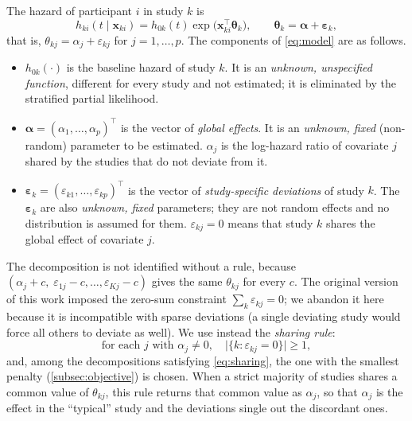 \documentclass[11pt]{article}
\theoremstyle{remark}
\numberwithin{equation}{section}
\newcommand{\bx}{\mathbf{x}}
\newcommand{\balpha}{\boldsymbol{\alpha}}
\newcommand{\beps}{\boldsymbol{\varepsilon}}
\newcommand{\btheta}{\boldsymbol{\theta}}
\begin{document}
The hazard of participant $i$ in study $k$ is
\begin{equation}
  h_{ki}(t\mid\bx_{ki}) = h_{0k}(t)\exp\bigl(\bx_{ki}^\top\btheta_k\bigr),
  \qquad
  \btheta_k=\balpha+\beps_k ,
  \label{eq:model}
\end{equation}
that is, $\theta_{kj}=\alpha_j+\varepsilon_{kj}$ for $j=1,\dots,p$. The
components of \eqref{eq:model} are as follows.
\begin{itemize}
  \item $h_{0k}(\cdot)$ is the baseline hazard of study $k$. It is an
    \emph{unknown, unspecified function}, different for every study and not
    estimated; it is eliminated by the stratified partial likelihood.
  \item $\balpha=(\alpha_1,\dots,\alpha_p)^\top$ is the vector of
    \emph{global effects}. It is an \emph{unknown, fixed} (non-random)
    parameter to be estimated. $\alpha_j$ is the log-hazard ratio of covariate
    $j$ shared by the studies that do not deviate from it.
  \item $\beps_k=(\varepsilon_{k1},\dots,\varepsilon_{kp})^\top$ is the vector
    of \emph{study-specific deviations} of study $k$. The $\beps_k$ are also
    \emph{unknown, fixed} parameters; they are not random effects and no
    distribution is assumed for them. $\varepsilon_{kj}=0$ means that study $k$
    shares the global effect of covariate $j$.
\end{itemize}
The decomposition is not identified without a rule, because
$(\alpha_j+c,\;\varepsilon_{1j}-c,\dots,\varepsilon_{Kj}-c)$ gives the same
$\theta_{kj}$ for every $c$. The original version of this work imposed the
zero-sum constraint $\sum_k\varepsilon_{kj}=0$; we abandon it here because it is
incompatible with sparse deviations (a single deviating study would force all
others to deviate as well). We use instead the \emph{sharing rule}:
\begin{equation}
  \text{for each } j \text{ with } \alpha_j\neq 0,\quad
  \bigl|\{k:\varepsilon_{kj}=0\}\bigr| \ge 1,
  \label{eq:sharing}
\end{equation}
and, among the decompositions satisfying \eqref{eq:sharing}, the one with the
smallest penalty (\cref{subsec:objective}) is chosen. When a strict majority of
studies shares a common value of $\theta_{kj}$, this rule returns that common
value as $\alpha_j$, so that $\alpha_j$ is the effect in the ``typical'' study
and the deviations single out the discordant ones.
\end{document}
